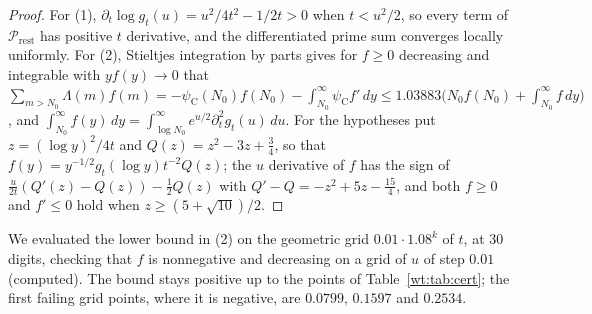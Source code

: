 \begin{proof}
For (1), $\partial_t\log g_t(u)=u^2/4t^2-1/2t>0$ when $t<u^2/2$, so every term of $\mathcal P_{\mathrm{rest}}$ has positive $t$ derivative, and the differentiated prime sum converges locally uniformly. For (2), Stieltjes integration by parts gives for $f\ge0$ decreasing and integrable with $yf(y)\to0$ that $\sum_{m>N_0}\Lambda(m)f(m)=-\psi_{\mathrm C}(N_0)f(N_0)-\int_{N_0}^\infty\psi_{\mathrm C}f'\,dy\le1.03883\big(N_0f(N_0)+\int_{N_0}^\infty f\,dy\big)$, and $\int_{N_0}^\infty f(y)\,dy=\int_{\log N_0}^\infty e^{u/2}\partial_t^2g_t(u)\,du$. For the hypotheses put $z=(\log y)^2/4t$ and $Q(z)=z^2-3z+\frac34$, so that $f(y)=y^{-1/2}g_t(\log y)t^{-2}Q(z)$; the $u$ derivative of $f$ has the sign of $\frac u{2t}(Q'(z)-Q(z))-\frac12Q(z)$ with $Q'-Q=-z^2+5z-\frac{15}4$, and both $f\ge0$ and $f'\le0$ hold when $z\ge(5+\sqrt{10})/2$.
\end{proof}

\begin{resultpar}\label{wt:res:cert}
We evaluated the lower bound in (2) on the geometric grid $0.01\cdot1.08^k$ of $t$, at 30 digits, checking that $f$ is nonnegative and decreasing on a grid of $u$ of step $0.01$ (computed). The bound stays positive up to the points of Table~\ref{wt:tab:cert}; the first failing grid points, where it is negative, are $0.0799$, $0.1597$ and $0.2534$.\end{resultpar}

\begin{table}[h]\centering\small
{}
\caption{Windows for $W''>0$ suggested by the bound of Proposition~\ref{wt:prop:cert}(2) from the primes up to $N_0$ with the Rosser and Schoenfeld tail (computed in floating point on a grid; not certified).}\label{wt:tab:cert}
\end{table}

